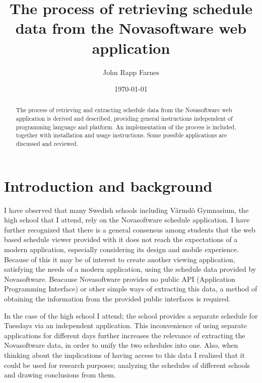 \documentclass{article}
\begin{document}
	\title{The process of retrieving schedule data from the Novasoftware web application}
	
	\author{John Rapp Farnes}
	
	\date{\today}
	
	\maketitle
	
	\begin{abstract}\noindent
		The process of retrieving and extracting schedule data from the Novasoftware web application is derived and described, providing general instructions independent of programming language and platform. %
		An implementation of the process is included, together with installation and usage instructions. Some possible applications are discussed and reviewed.
	\end{abstract}
	
	\newpage
	
	\tableofcontents
	
	\cleardoublepage
	\pagestyle{plain}
	
	\section{Introduction and background}
	I have observed that many Swedish schools including Värmdö Gymnasium, the high school that I attend, rely on the Novasoftware schedule application. I have further recognized that there is a general consensus among students that the web based schedule viewer provided with it does not reach the expectations of a modern application, especially considering its design and mobile experience. Because of this it may be of interest to create another viewing application, satisfying the needs of a modern application, using the schedule data provided by Novasoftware. Beacause Novasoftware provides no public API (Application Programming Interface) or other simple ways of extracting this data, a method of obtaining the information from the provided public interfaces is required.
	
	In the case of the high school I attend; the school provides a separate schedule for Tuesdays via an independent application. This inconvenience of using separate applications for different days further increases the relevance of extracting the Novasoftware data, in order to unify the two schedules into one. Also, when thinking about the implications of having access to this data I realized that it could be used for research purposes; analyzing the schedules of different schools and drawing conclusions from them.
	
\end{document}
